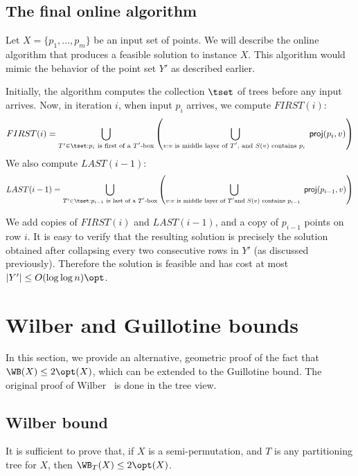 \documentclass[11pt]{article}
\numberwithin{equation}{section}
\theoremstyle{definition}
\theoremstyle{plain}
\begin{document}
\fi

\subsection{The final online algorithm} \label{subsec: online final}
Let $X=\{p_1,\ldots, p_m\}$ be an input set of points. 
We will describe the online algorithm that produces a feasible solution to instance $X$. 
This algorithm would mimic the behavior of the point set $Y'$ as described earlier. 

Initially, the algorithm computes the collection $\tset$ of trees before any input arrives. 
Now, in iteration $i$, when input $p_i$ arrives, we compute $FIRST(i)$: 
\[FIRST(i) = \bigcup_{T' \in \tset: p_i \text{ is first of a $T'$-box}} \left( \bigcup_{v:\text{$v$ is middle layer of $T'$, and $S(v)$ contains $p_i$ }} {\sf proj}(p_i, v)\right) \] 
We also compute $LAST(i-1)$: 
\[LAST(i-1)= \bigcup_{T' \in \tset: p_{i-1} \text{ is last of a $T'$-box}} \left( \bigcup_{v:\text{$v$ is middle layer of $T'$}\\ \text{and $S(v)$ contains $p_{i-1}$ }} {\sf proj}(p_{i-1}, v)\right)\]
%

We add copies of $FIRST(i)$ and $LAST(i-1)$, and a copy of $p_{i-1}$ points on row $i$. 
It is easy to verify that the resulting solution is precisely the solution obtained after collapsing every two consecutive rows in $Y'$ (as discussed previously). Therefore the solution is feasible and has cost at most $|Y'| \leq O(\log \log n) \opt$.   



%

%
 
%
%
%
%
    
%
%

%

%

\section{Wilber and Guillotine bounds} 
\label{sec:direct WB LB}

In this section, we provide an alternative, geometric proof of the fact that $\WB(X) \leq 2 \opt(X)$, which can be extended to the Guillotine bound. 
The original proof of Wilber~\cite{wilber} is done in the tree view. 
%

\subsection{Wilber bound} 
It is sufficient to prove that, if $X$ is a semi-permutation, and $T$ is any partitioning tree for $X$, then $\WB_T(X) \leq 2\opt(X)$. %
\end{document}

